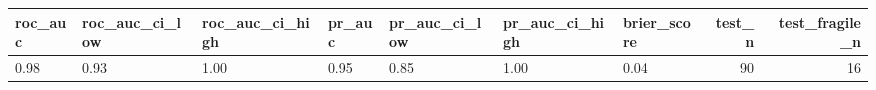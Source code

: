 \begin{tabular}{lllllllrr}
\toprule
roc\_auc & roc\_auc\_ci\_low & roc\_auc\_ci\_high & pr\_auc & pr\_auc\_ci\_low & pr\_auc\_ci\_high & brier\_score & test\_n & test\_fragile\_n \\
\midrule
0.98 & 0.93 & 1.00 & 0.95 & 0.85 & 1.00 & 0.04 & 90 & 16 \\
\bottomrule
\end{tabular}
